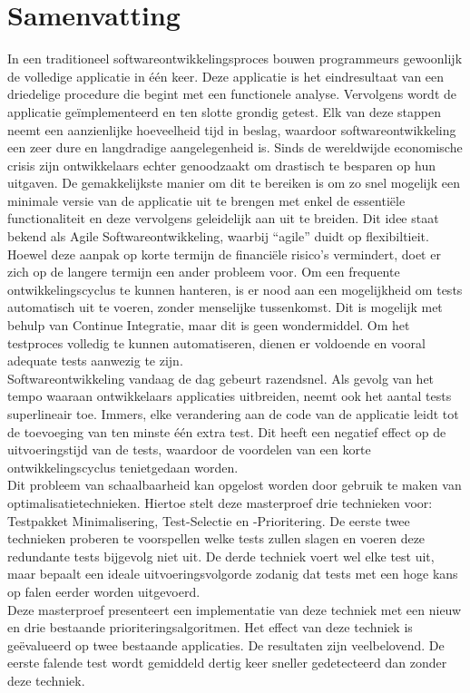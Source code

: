 
\chapter*{Samenvatting}
In een traditioneel softwareontwikkelingsproces bouwen programmeurs gewoonlijk de volledige applicatie in één keer. Deze applicatie is het eindresultaat van een driedelige procedure die begint met een functionele analyse. Vervolgens wordt de applicatie ge\"implementeerd en ten slotte grondig getest. Elk van deze stappen neemt een aanzienlijke hoeveelheid tijd in beslag, waardoor softwareontwikkeling een zeer dure en langdradige aangelegenheid is. Sinds de wereldwijde economische crisis zijn ontwikkelaars echter genoodzaakt om drastisch te besparen op hun uitgaven. De gemakkelijkste manier om dit te bereiken is om zo snel mogelijk een minimale versie van de applicatie uit te brengen met enkel de essenti\"ele functionaliteit en deze vervolgens geleidelijk aan uit te breiden. Dit idee staat bekend als Agile Softwareontwikkeling, waarbij ``agile'' duidt op flexibiltieit.\\

\noindent Hoewel deze aanpak op korte termijn de financiële risico's vermindert, doet er zich op de langere termijn een ander probleem voor. Om een frequente ontwikkelingscyclus te kunnen hanteren, is er nood aan een mogelijkheid om tests automatisch uit te voeren, zonder menselijke tussenkomst. Dit is mogelijk met behulp van Continue Integratie, maar dit is geen wondermiddel. Om het testproces volledig te kunnen automatiseren, dienen er voldoende en vooral adequate tests aanwezig te zijn.\\

\noindent Softwareontwikkeling vandaag de dag gebeurt razendsnel. Als gevolg van het tempo waaraan ontwikkelaars applicaties uitbreiden, neemt ook het aantal tests superlineair toe. Immers, elke verandering aan de code van de applicatie leidt tot de toevoeging van ten minste één extra test. Dit heeft een negatief effect op de uitvoeringstijd van de tests, waardoor de voordelen van een korte ontwikkelingscyclus tenietgedaan worden.\\

\noindent Dit probleem van schaalbaarheid kan opgelost worden door gebruik te maken van optimalisatietechnieken. Hiertoe stelt deze masterproef drie technieken voor: Testpakket Minimalisering, Test-Selectie en -Prioritering. De eerste twee technieken proberen te voorspellen welke tests zullen slagen en voeren deze redundante tests bijgevolg niet uit. De derde techniek voert wel elke test uit, maar bepaalt een ideale uitvoeringsvolgorde zodanig dat tests met een hoge kans op falen eerder worden uitgevoerd.\\

\noindent Deze masterproef presenteert een implementatie van deze techniek met een nieuw en drie bestaande prioriteringsalgoritmen. Het effect van deze techniek is geëvalueerd op twee bestaande applicaties. De resultaten zijn veelbelovend. De eerste falende test wordt gemiddeld dertig keer sneller gedetecteerd dan zonder deze techniek.
